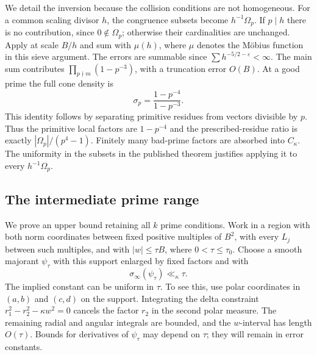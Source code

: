 \documentclass[11pt,reqno]{amsart}
\theoremstyle{definition}
\numberwithin{equation}{section}
\begin{document}
We detail the inversion because the collision conditions are not homogeneous. For a common scaling divisor $h$, the congruence subsets become $h^{-1}\Omega_p$. If $p\mid h$ there is no contribution, since $0\notin\Omega_p$; otherwise their cardinalities are unchanged. Apply \cite[Theorem 4.1]{BL} at scale $B/h$ and sum with $\mu(h)$, where $\mu$ denotes the M\"obius function in this sieve argument. The errors are summable since $\sum h^{-5/2-\varepsilon}<\infty$. The main sum contributes $\prod_{p\nmid m}(1-p^{-3})$, with a truncation error $O(B)$. At a good prime the full cone density is
\[
 \sigma_p=\frac{1-p^{-4}}{1-p^{-3}}.
\]
This identity follows by separating primitive residues from vectors divisible by $p$. Thus the primitive local factors are $1-p^{-4}$ and the prescribed-residue ratio is exactly $|\Omega_p|/(p^4-1)$. Finitely many bad-prime factors are absorbed into $C_\kappa$. The uniformity in the subsets in the published theorem justifies applying it to every $h^{-1}\Omega_p$.

\subsection{The intermediate prime range}\label{an:sec:medium}
We prove an upper bound retaining all $k$ prime conditions. Work in a region with both norm coordinates between fixed positive multiples of $B^2$, with every $L_j$ between such multiples, and with $|w|\le\tau B$, where $0<\tau\le\tau_0$. Choose a smooth majorant $\psi_\tau$ with this support enlarged by fixed factors and with
\begin{equation}\label{an:eq:realmass}
 \sigma_\infty(\psi_\tau)\ll_\kappa\tau.
\end{equation}
The implied constant can be uniform in $\tau$. To see this, use polar coordinates in $(a,b)$ and $(c,d)$ on the support. Integrating the delta constraint $r_1^2-r_2^2-\kappa w^2=0$ cancels the factor $r_2$ in the second polar measure. The remaining radial and angular integrals are bounded, and the $w$-interval has length $O(\tau)$. Bounds for derivatives of $\psi_\tau$ may depend on $\tau$; they will remain in error constants.
\end{document}
